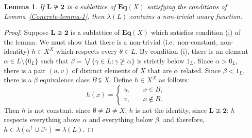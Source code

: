 \documentclass[cm,dissertation,actual,final]{uhthesis}
\theoremstyle{plain}
\newtheorem{lemma}[theorem]{Lemma}
\theoremstyle{definition}
\theoremstyle{remark}
\numberwithin{theorem}{section}
\numberwithin{claim}{chapter}
\numberwithin{equation}{section}
\numberwithin{conjecture}{chapter}
\newcommand{\<}{\ensuremath{\langle}}
\renewcommand{\>}{\ensuremath{\rangle}}
\renewcommand{\ngeq}{\ensuremath{\ngeqslant}}
\newcommand{\bEqX}{\ensuremath{\mathbf{Eq}(X)}}
\newcommand{\0}{\ensuremath{\mathbf{0}}}
\newcommand{\1}{\ensuremath{\mathbf{1}}}
\newcommand{\2}{\ensuremath{\mathbf{2}}}
\newcommand{\3}{\ensuremath{\mathbf{3}}}
\newcommand{\4}{\ensuremath{\mathbf{4}}}
\newcommand{\5}{\ensuremath{\mathbf{5}}}
\newcommand{\bL}{\ensuremath{\mathbf{L}}}
\newcommand{\upalpha}{\ensuremath{\alpha^{\uparrow}}}
\newcommand{\downbeta}{\ensuremath{\beta^{\downarrow}}}
\begin{document}
\begin{lemma} 
\label{Concrete-lemma-2} 
If $\bL\ncong \mathbf{2}$ is a sublattice of $\bEqX$ satisfying the
conditions of Lemma~\ref{Concrete-lemma-1}, then $\lambda(L)$ contains a non-trivial unary function.
\end{lemma}
\begin{proof}
Suppose $\bL\ncong \mathbf{2}$ is a sublattice of $\bEqX$ which satisfies condition (i)
of the lemma.  We must show that there is a non-trivial (i.e.~non-constant, non-identity)
$h\in X^X$ which respects every $\theta \in L$.  
By condition (i), there is an element $\alpha \in L \setminus \{0_L\}$ such that $\beta =
\bigvee\{\gamma\in L: \gamma \ngeq \alpha \}$ is strictly below $1_L$. Since 
$\alpha > 0_L$, there is a pair $(u,v)$ of distinct elements of $X$ that are
$\alpha$ related.  Since $\beta < 1_L$, there is a $\beta$ equivalence class 
$B \subsetneqq X$.  Define $h\in X^X$ as follows:
\begin{equation}
  \label{eq:h}
h(x) = \begin{cases}
u,& \quad x\in B,\\
v,& \quad x\notin B.
\end{cases}
\end{equation}
Then $h$ is not constant, since $\emptyset \neq B \neq X$;
$h$ is not the identity, since $\bL\ncong \mathbf{2}$; $h$
respects everything above $\alpha$ and everything below $\beta$, and therefore, $h\in
\lambda(\upalpha \cup \downbeta) = \lambda(L)$.
\end{proof}
\end{document}
